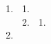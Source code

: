 \documentclass[12pt]{article}
\begin{document}
\begin{enumerate}
    \item \lipsum[1] %
    
    \begin{enumerate}
        \item \lipsum[1] %

        \item \lipsum[1]
        
        \begin{enumerate}
            \item \lipsum[1] %
        \end{enumerate}

    \end{enumerate}
    
    \item \lipsum[1] %
    
\end{enumerate}

\end{document}

